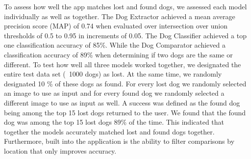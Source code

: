 \documentclass{article}
\begin{document}
	To assess how well the app matches lost and found dogs, we assessed each model individually as well as together.  The Dog Extractor achieved a mean average precision score (MAP) of 0.74 when evaluated over intersection over union thresholds of 0.5 to 0.95 in increments of 0.05.  The Dog Classifier achieved a top one classification accuracy of 85\%.  While the Dog Comparator achieved a classification accuracy of 89\% when determining if two dogs are the same or different.  To test how well all three models worked together, we designated the entire test data set (~1000 dogs) as lost.  At the same time, we randomly designated 10 \% of these dogs as found.  For every lost dog we randomly selected an image to use as input and for every found dog we randomly selected a different image to use as input as well.   A success was defined as the found dog being among the top 15 lost dogs returned to the user.  We found that the found dog was among the top 15 lost dogs 89\% of the time.  This indicated that together the models accurately matched lost and found dogs together.  Furthermore, built into the application is the ability to filter comparisons by location that only improves accuracy.

\newpage



\end{document}

